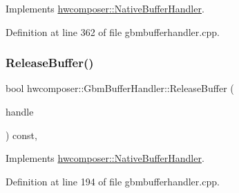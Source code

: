Implements \mbox{\hyperlink{classhwcomposer_1_1NativeBufferHandler_a4ef1e64030d28540265fac46d503e9b8}{hwcomposer\+::\+Native\+Buffer\+Handler}}.



Definition at line 362 of file gbmbufferhandler.\+cpp.


\begin{DoxyCode}{0}
\end{DoxyCode}
\mbox{\label{classhwcomposer_1_1GbmBufferHandler_a9c2554d5c2fe0a76b785352754d369a1}} 
\subsubsection{\texorpdfstring{Release\+Buffer()}{ReleaseBuffer()}}
{\footnotesize\ttfamily bool hwcomposer\+::\+Gbm\+Buffer\+Handler\+::\+Release\+Buffer (\begin{DoxyParamCaption}\item[{\mbox{\hyperlink{alios_2platformdefines_8h_ac0a2eaf260f556d17fe489911f017bdf}{H\+W\+C\+Native\+Handle}}}]{handle }\end{DoxyParamCaption}) const\hspace{0.3cm}{\ttfamily [override]}, {\ttfamily [virtual]}}



Implements \mbox{\hyperlink{classhwcomposer_1_1NativeBufferHandler_abff911db92343545a36a0cc44a8d2eb8}{hwcomposer\+::\+Native\+Buffer\+Handler}}.



Definition at line 194 of file gbmbufferhandler.\+cpp.


